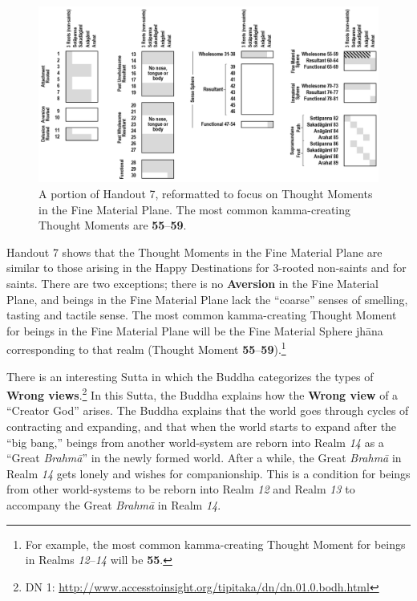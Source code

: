 \pagebreak

\begin{figure}[h]
\centering
\includegraphics[width=1\linewidth]{./Diagrams/Fine}
\caption{A portion of Handout 7, reformatted to focus on Thought Moments in the Fine Material Plane. The most common kamma-creating Thought Moments are \textbf{55}--\textbf{59}.}
\label{fig:Fine}
\end{figure}

Handout 7 shows that the Thought Moments in the Fine Material Plane are similar to those arising in the Happy Destinations for 3-rooted non-saints and for saints. There are two exceptions; there is no \textbf{Aversion} in the Fine Material Plane, and beings in the Fine Material Plane lack the “coarse” senses of smelling, tasting and tactile sense. The most common kamma-creating Thought Moment for beings in the Fine Material Plane will be the Fine Material Sphere jhāna corresponding to that realm (Thought Moment \textbf{55}--\textbf{59}).\footnote{For example, the most common kamma-creating Thought Moment for beings in Realms \textit{12}--\textit{14} will be \textbf{55}.}

There is an interesting Sutta in which the Buddha categorizes the types of \textbf{Wrong views}.\footnote{DN 1: \url{http://www.accesstoinsight.org/tipitaka/dn/dn.01.0.bodh.html}} In this Sutta, the Buddha explains how the \textbf{Wrong view} of a “Creator God” arises. The Buddha explains that the world goes through cycles of contracting and expanding, and that when the world starts to expand after the “big bang,” beings from another world-system are reborn into Realm \textit{14} as a “Great \textit{Brahmā}” in the newly formed world. After a while, the Great \textit{Brahmā} in Realm \textit{14} gets lonely and wishes for companionship. This is a condition for beings from other world-systems to be reborn into Realm \textit{12} and Realm \textit{13} to accompany the Great \textit{Brahmā} in Realm \textit{14}.

